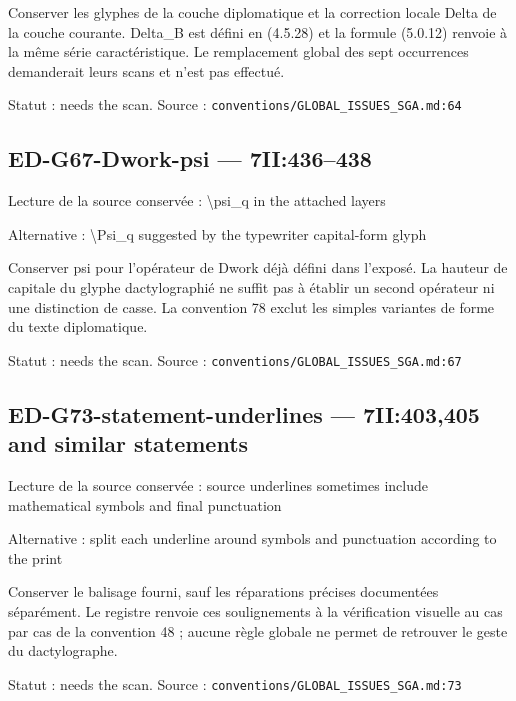 Conserver les glyphes de la couche diplomatique et la correction locale Delta de la couche courante. Delta\_B est défini en (4.5.28) et la formule (5.0.12) renvoie à la même série caractéristique. Le remplacement global des sept occurrences demanderait leurs scans et n’est pas effectué.

Statut : needs the scan. Source : \nolinkurl{conventions/GLOBAL_ISSUES_SGA.md:64}

\subsection*{ED-G67-Dwork-psi — 7II:436–438}

Lecture de la source conservée : \textbackslash{}psi\_q in the attached layers

Alternative : \textbackslash{}Psi\_q suggested by the typewriter capital-form glyph

Conserver psi pour l’opérateur de Dwork déjà défini dans l’exposé. La hauteur de capitale du glyphe dactylographié ne suffit pas à établir un second opérateur ni une distinction de casse. La convention 78 exclut les simples variantes de forme du texte diplomatique.

Statut : needs the scan. Source : \nolinkurl{conventions/GLOBAL_ISSUES_SGA.md:67}

\subsection*{ED-G73-statement-underlines — 7II:403,405 and similar statements}

Lecture de la source conservée : source underlines sometimes include mathematical symbols and final punctuation

Alternative : split each underline around symbols and punctuation according to the print

Conserver le balisage fourni, sauf les réparations précises documentées séparément. Le registre renvoie ces soulignements à la vérification visuelle au cas par cas de la convention 48 ; aucune règle globale ne permet de retrouver le geste du dactylographe.

Statut : needs the scan. Source : \nolinkurl{conventions/GLOBAL_ISSUES_SGA.md:73}
